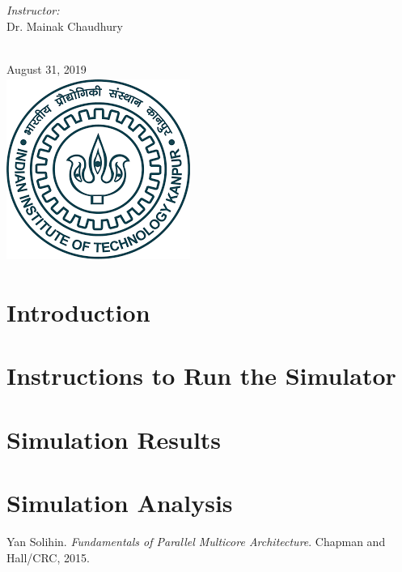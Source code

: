 \documentclass[12pt]{article}
\begin{document}
\begin{titlepage}
\begin{minipage}{0.4\textwidth}
\end{minipage}
\begin{minipage}{0.4\textwidth}
\begin{flushright} \large
\emph{Instructor:} \\
Dr. Mainak Chaudhury %
\end{flushright}
\end{minipage}\\[1cm]
{\large August 31, 2019}\\[1cm] %
\includegraphics[width=6cm,height=6cm,keepaspectratio]{iitk.png}%
\vfill %

\end{titlepage}
\newpage

\section{Introduction}


\section{Instructions to Run the Simulator}


\newpage
\section{Simulation Results}


\vspace{0.3cm}
\section{Simulation Analysis}



\medskip
 
\begin{thebibliography}{9}
Yan Solihin. 
\textit{Fundamentals of Parallel Multicore Architecture}. 
Chapman and Hall/CRC, 2015.

\end{thebibliography}
\end{document}
